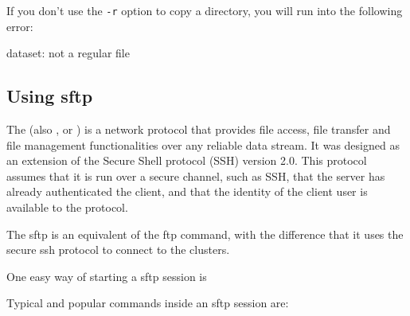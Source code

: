 \begin{prompt}
\end{prompt}

If you don't use the \lstinline|-r| option to copy a directory, you will run into the following error:

\begin{prompt}
dataset: not a regular file
\end{prompt}



  \subsection{Using sftp}

  The  (also , or ) is a network protocol that provides file access,
  file transfer and file management functionalities over any reliable data
  stream. It was designed as an extension of the Secure Shell protocol (SSH)
  version 2.0. This protocol assumes that it is run over a secure channel, such
  as SSH, that the server has already authenticated the client, and that the
  identity of the client user is available to the protocol.

  The sftp is an equivalent of the ftp command, with the difference that it uses
  the secure ssh protocol to connect to the clusters.

  One easy way of starting a sftp session is

\begin{prompt}
\end{prompt}

  Typical and popular commands inside an sftp session are:

